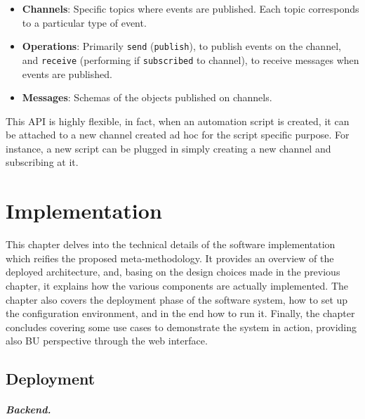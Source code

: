 \documentclass[12pt,a4paper,openright,twoside]{book}
\begin{document}
\begin{itemize}
    \item \textbf{Channels}: Specific topics where events are published. Each topic corresponds to a particular type of event.
    \item \textbf{Operations}: Primarily \texttt{send} (\texttt{publish}), to publish events on the channel, and \texttt{receive} (performing if \texttt{subscribed} to channel), to receive messages when events are published.
    \item \textbf{Messages}: Schemas of the objects published on channels.
\end{itemize}


This API is highly flexible, in fact, when an automation script is created, it can be attached to a new channel created ad hoc for the script specific purpose.
%
For instance, a new script can be plugged in simply  creating a new channel and subscribing at it.




\chapter{Implementation}%
\label{chap:implementation}

This chapter delves into the technical details of the software implementation which reifies the proposed meta-methodology.
%
It provides an overview of the deployed architecture, and, basing on the design choices made in the previous chapter, it explains how the various components are actually implemented.
% 
The chapter also covers the deployment phase of the software system, how to set up the configuration environment, and in the end how to run it.
%
Finally, the chapter concludes covering some use cases to demonstrate the system in action, providing also \acf{BU} perspective through the web interface.


\section{Deployment}



\paragraph{Backend.}
\end{document}
